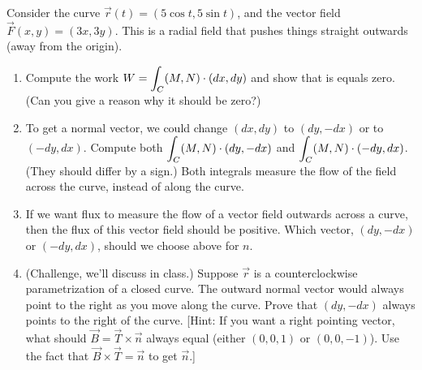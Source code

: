 \begin{problem}
 Consider the curve $\vec r(t) = (5\cos t, 5\sin t)$, and the vector field $\vec F(x,y) = (3x, 3y)$. This is a radial field that pushes things straight outwards (away from the origin).  
\begin{enumerate}
 \item Compute the work $\displaystyle W= \int_C (M,N)\cdot (dx,dy)$ and show that is equals zero. (Can you give a reason why it should be zero?) 
 \item To get a normal vector, we could change $(dx,dy)$ to $(dy,-dx)$ or to $(-dy,dx)$. Compute both 
$\displaystyle \int_C (M,N)\cdot (dy,-dx)$ and $\displaystyle \int_C (M,N)\cdot (-dy,dx)$. (They should differ by a sign.) Both integrals measure the flow of the field across the curve, instead of along the curve. 
 \item If we want flux to measure the flow of a vector field outwards across a curve, then the flux of this vector field should be positive.  Which vector, $(dy,-dx)$ or $(-dy,dx)$,  should we choose above for $n$. 
 \item (Challenge, we'll discuss in class.) Suppose $\vec r$ is a counterclockwise parametrization of a closed curve.  The outward normal vector would always point to the right as you move along the curve.  Prove that $(dy,-dx)$ always points to the right of the curve. [Hint: If you want a right pointing vector, what should $\vec B=\vec T\times \vec n$ always equal (either $(0,0,1)$ or $(0,0,-1)$). Use the fact that $\vec B\times \vec T = \vec n$ to get $\vec n$.]
\end{enumerate}

\end{problem}

 

